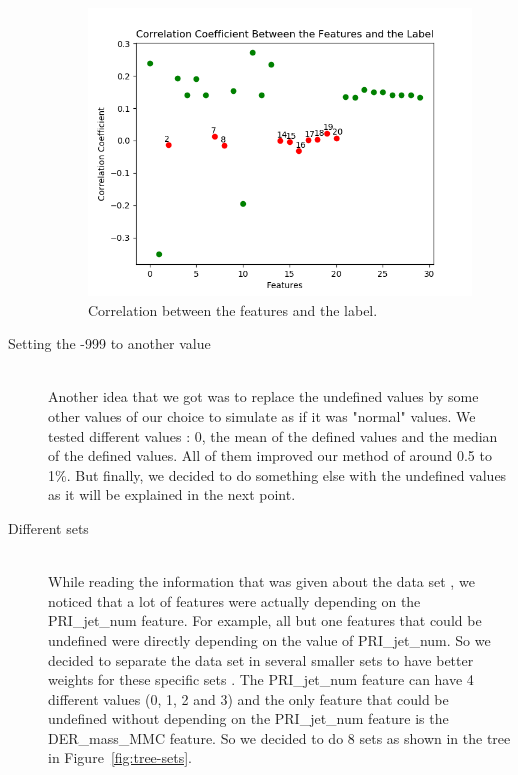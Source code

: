 \documentclass[10pt,conference,compsocconf]{IEEEtran}
\begin{document}
\begin{description}
\begin{figure}[hbtp]
  \centering
  \includegraphics[width=\columnwidth]{images/corrcoefs.png}
  \caption{Correlation between the features and the label.}
  \vspace{-3mm}
  \label{fig:corr-coefs}
\end{figure}

\item[Setting the -999 to another value] \ \\
Another idea that we got was to replace the undefined values by some other values of our choice to simulate as if it was "normal" values. We tested different values : 0, the mean of the defined values and the median of the defined values. All of them improved our method of around 0.5 to 1\%. But finally, we decided to do something else with the undefined values as it will be explained in the next point.

\item[Different sets] \ \\
While reading the information that was given about the data set  \cite{higgschallenge14}, we noticed that a lot of features were actually depending on the PRI\_jet\_num feature. For example, all but one features that could be undefined were directly depending on the value of PRI\_jet\_num. So we decided to separate the data set in several smaller sets to have better weights for these specific sets \cite{brown14}. The PRI\_jet\_num feature can have 4 different values (0, 1, 2 and 3) and the only feature that could be undefined without depending on the PRI\_jet\_num feature is the DER\_mass\_MMC feature. So we decided to do 8 sets as shown in the tree in Figure~\ref{fig:tree-sets}. 


\end{description}
\end{document}
